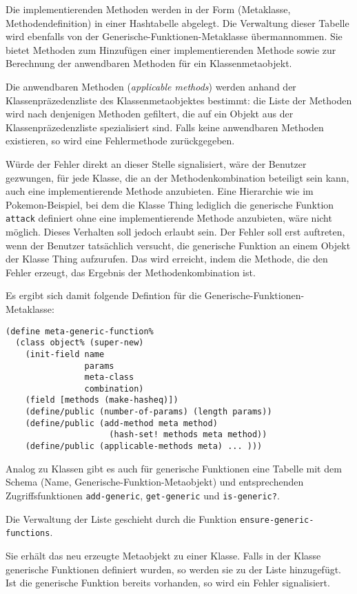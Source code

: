 Die implementierenden Methoden werden in der Form (Metaklasse, Methodendefinition) in einer Hashtabelle abgelegt. Die Verwaltung dieser Tabelle wird ebenfalls von der Generische-Funktionen-Metaklasse übermannommen. Sie bietet Methoden zum Hinzufügen einer implementierenden Methode sowie zur Berechnung der anwendbaren Methoden für ein Klassenmetaobjekt.

Die anwendbaren Methoden (\emph{applicable methods}) werden anhand der Klassenpräzedenzliste des Klassenmetaobjektes bestimmt: die Liste der Methoden wird nach denjenigen Methoden gefiltert, die auf ein Objekt aus der Klassenpräzedenzliste spezialisiert sind. Falls keine anwendbaren Methoden existieren, so wird eine Fehlermethode zurückgegeben. 

Würde der Fehler direkt an dieser Stelle signalisiert, wäre der Benutzer gezwungen, für jede Klasse, die an der Methodenkombination beteiligt sein kann, auch eine implementierende Methode anzubieten. Eine Hierarchie wie im Pokemon-Beispiel, bei dem die Klasse Thing lediglich die generische Funktion \texttt{attack} definiert ohne eine implementierende Methode anzubieten, wäre nicht möglich. Dieses Verhalten soll jedoch erlaubt sein. Der Fehler soll erst auftreten, wenn der Benutzer tatsächlich versucht, die generische Funktion an einem Objekt der Klasse Thing aufzurufen. Das wird erreicht, indem die Methode, die den Fehler erzeugt, das Ergebnis der Methodenkombination ist.

Es ergibt sich damit folgende Defintion für die Generische-Funktionen-Metaklasse:

\begin{lstlisting}
(define meta-generic-function%
  (class object% (super-new)
    (init-field name
                params
                meta-class
                combination) 
    (field [methods (make-hasheq)]) 
    (define/public (number-of-params) (length params))
    (define/public (add-method meta method) 
                     (hash-set! methods meta method))
    (define/public (applicable-methods meta) ... )))
\end{lstlisting}

Analog zu Klassen gibt es auch für generische Funktionen eine Tabelle mit dem Schema (Name, Generische-Funktion-Metaobjekt) und entsprechenden Zugriffsfunktionen \texttt{add-generic}, \texttt{get-generic} und \texttt{is-generic?}.

Die Verwaltung der Liste geschieht durch die Funktion \texttt{ensure-generic-functions}. 

Sie erhält das neu erzeugte Metaobjekt zu einer Klasse. Falls in der Klasse generische Funktionen definiert wurden, so werden sie zu der Liste hinzugefügt. Ist die generische Funktion bereits vorhanden, so wird ein Fehler signalisiert.

